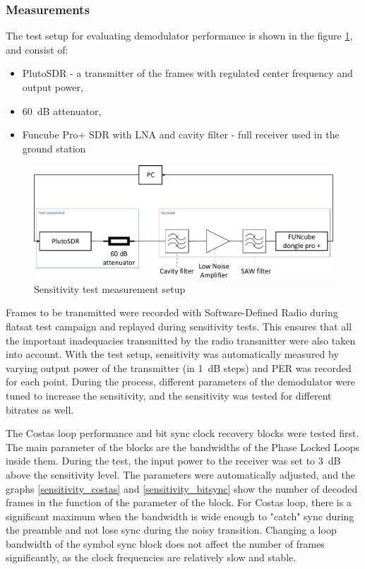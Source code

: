 \subsubsection{Measurements}
The test setup for evaluating demodulator performance is shown in the figure \ref{sensitivity_test_diagram}, and consist of:
\begin{itemize}
    \item PlutoSDR - a transmitter of the frames with regulated center frequency and output power,
    \item \SI{60}{\dB} attenuator,
    \item Funcube Pro+ SDR with LNA and cavity filter - full receiver used in the ground station
\end{itemize}

\begin{figure}
    \centering
    \includegraphics[width=0.8\paperwidth]{img/7/sensitivity_test_diagram.pdf}
    \caption{Sensitivity test measurement setup}
    \label{sensitivity_test_diagram}
\end{figure}

Frames to be transmitted were recorded with Software-Defined Radio during flatsat test campaign and replayed during sensitivity tests. This ensures that all the important inadequacies transmitted by the radio transmitter were also taken into account. With the test setup, sensitivity was automatically measured by varying output power of the transmitter (in \SI{1}{\dB} steps) and PER was recorded for each point. During the process, different parameters of the demodulator were tuned to increase the sensitivity, and the sensitivity was tested for different bitrates as well.

The Costas loop performance and bit sync clock recovery blocks were tested first. The main parameter of the blocks are the bandwidths of the Phase Locked Loops inside them. During the test, the input power to the receiver was set to \SI{3}{\dB} above the sensitivity level. The parameters were automatically adjusted, and the graphs \ref{sensitivity_costas} and \ref{sensitivity_bitsync} show the number of decoded frames in the function of the parameter of the block. For Costas loop, there is a significant maximum when the bandwidth is wide enough to "catch" sync during the preamble and not lose sync during the noisy transition. Changing a loop bandwidth of the symbol sync block does not affect the number of frames significantly, as the clock frequencies are relatively slow and stable.

